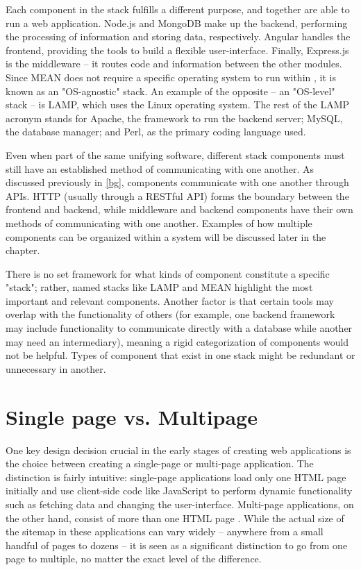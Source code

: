 Each component in the stack fulfills a different purpose, and together are able to run a web application. Node.js and MongoDB make up the backend, performing the processing of information and storing data, respectively. Angular handles the frontend, providing the tools to build a flexible user-interface. Finally, Express.js is the middleware -- it routes code and information between the other modules. Since MEAN does not require a specific operating system to run within \cite{noauthor_what_nodate}, it is known as an "OS-agnostic" stack. An example of the opposite -- an "OS-level" stack -- is LAMP, which uses the Linux operating system. The rest of the LAMP acronym stands for Apache, the framework to run the backend server; MySQL, the database manager; and Perl, as the primary coding language used.

Even when part of the same unifying software, different stack components must still have an established method of communicating with one another. As discussed previously in \autoref{bg}, components communicate with one another through APIs. HTTP (usually through a RESTful API) forms the boundary between the frontend and backend, while middleware and backend components have their own methods of communicating with one another. Examples of how multiple components can be organized within a system will be discussed later in the chapter.

There is no set framework for what kinds of component constitute a specific "stack"; rather, named stacks like LAMP and MEAN highlight the most important and relevant components. Another factor is that certain tools may overlap with the functionality of others (for example, one backend framework may include functionality to communicate directly with a database while another may need an intermediary), meaning a rigid categorization of components would not be helpful. Types of component that exist in one stack might be redundant or unnecessary in another.

\section{Single page vs. Multipage}

One key design decision crucial in the early stages of creating web applications is the choice between creating a single-page or multi-page application. The distinction is fairly intuitive: single-page applications load only one HTML page initially and use client-side code like JavaScript to perform dynamic functionality such as fetching data and changing the user-interface. Multi-page applications, on the other hand, consist of more than one HTML page \cite{adedeji_full-stack_2023}. While the actual size of the sitemap in these applications can vary widely -- anywhere from a small handful of pages to dozens -- it is seen as a significant distinction to go from one page to multiple, no matter the exact level of the difference.

